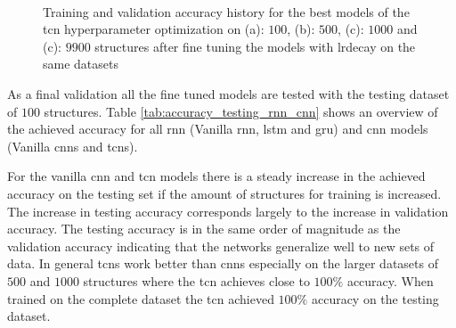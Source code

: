 \documentclass[conference]{IEEEtran}
\begin{document}
\begin{figure}[htp]
	\centering
	\quad
	\\
	\quad
	\caption{Training and validation accuracy history for the best models of the \gls{tcn} hyperparameter optimization on (a): $ 100 $, (b): $ 500 $, (c): $ 1000 $ and (c): $ 9900 $ structures after fine tuning the models with \gls{lrdecay} on the same datasets}
	\label{fig:accuracy_adaptiveLR_TCN}
\end{figure}


As a final validation all the fine tuned models are tested with the testing dataset of $ 100 $ structures. Table \ref{tab:accuracy_testing_rnn_cnn} shows an overview of the achieved accuracy for all \gls{rnn} (Vanilla \gls{rnn}, \gls{lstm} and \gls{gru}) and \gls{cnn} models (Vanilla \glspl{cnn} and \glspl{tcn}).

For the vanilla \gls{cnn} and \gls{tcn} models there is a steady increase in the achieved accuracy on the testing set if the amount of structures for training is increased. The increase in testing accuracy corresponds largely to the increase in validation accuracy. The testing accuracy is in the same order of magnitude as the validation accuracy indicating that the networks generalize well to new sets of data. In general \glspl{tcn} work better than \glspl{cnn} especially on the larger datasets of $ 500 $ and $ 1000 $ structures where the \gls{tcn} achieves close to $ 100 \% $ accuracy. When trained on the complete dataset the \gls{tcn} achieved $ 100 \% $ accuracy on the testing dataset.
\end{document}
